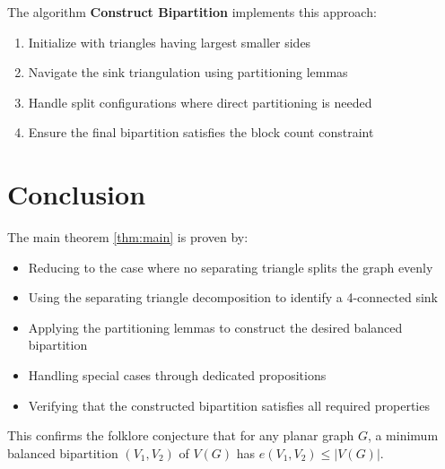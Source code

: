 The algorithm {\bf Construct Bipartition} implements this approach:

\begin{enumerate}
\item Initialize with triangles having largest smaller sides
\item Navigate the sink triangulation using partitioning lemmas
\item Handle split configurations where direct partitioning is needed
\item Ensure the final bipartition satisfies the block count constraint
\end{enumerate}

\section{Conclusion}

The main theorem \ref{thm:main} is proven by:
\begin{itemize}
\item Reducing to the case where no separating triangle splits the graph evenly
\item Using the separating triangle decomposition to identify a 4-connected sink
\item Applying the partitioning lemmas to construct the desired balanced bipartition
\item Handling special cases through dedicated propositions
\item Verifying that the constructed bipartition satisfies all required properties
\end{itemize}

\begin{corollary}
\label{cor:folklore}
This confirms the folklore conjecture that for any planar graph $G$, a minimum balanced bipartition $(V_1, V_2)$ of $V(G)$ has $e(V_1, V_2) \leq |V(G)|$.
\end{corollary}